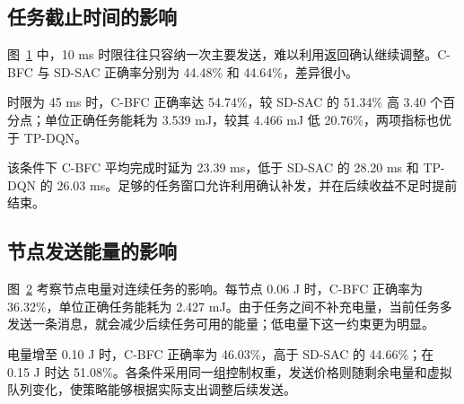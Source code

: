 \FloatBarrier
\subsection{任务截止时间的影响}
\label{rq3:subsec:deadline-results}

图~\ref{rq3:fig:deadline} 中，10 ms 时限往往只容纳一次主要发送，难以利用返回确认继续调整。C-BFC 与 SD-SAC 正确率分别为 44.48\% 和 44.64\%，差异很小。

\begin{figure}[!htbp]
  \centering
  \par\vspace{2pt}{\footnotesize 较长任务窗口允许反馈到达后继续调整发送，各方法均受到跨任务节点电量限制。}
  \label{rq3:fig:deadline}
\end{figure}

时限为 45 ms 时，C-BFC 正确率达 54.74\%，较 SD-SAC 的 51.34\% 高 3.40 个百分点；单位正确任务能耗为 3.539 mJ，较其 4.466 mJ 低 20.76\%，两项指标也优于 TP-DQN。

该条件下 C-BFC 平均完成时延为 23.39 ms，低于 SD-SAC 的 28.20 ms 和 TP-DQN 的 26.03 ms。足够的任务窗口允许利用确认补发，并在后续收益不足时提前结束。

\FloatBarrier
\subsection{节点发送能量的影响}
\label{rq3:subsec:energy-results}

图~\ref{rq3:fig:energy} 考察节点电量对连续任务的影响。每节点 0.06 J 时，C-BFC 正确率为 36.32\%，单位正确任务能耗为 2.427 mJ。由于任务之间不补充电量，当前任务多发送一条消息，就会减少后续任务可用的能量；低电量下这一约束更为明显。

\begin{figure}[!htbp]
  \centering
  \par\vspace{2pt}{\footnotesize 电量在同一次 611 个任务的回放中连续扣减，其他通信条件固定。}
  \label{rq3:fig:energy}
\end{figure}

电量增至 0.10 J 时，C-BFC 正确率为 46.03\%，高于 SD-SAC 的 44.66\%；在 0.15 J 时达 51.08\%。各条件采用同一组控制权重，发送价格则随剩余电量和虚拟队列变化，使策略能够根据实际支出调整后续发送。

